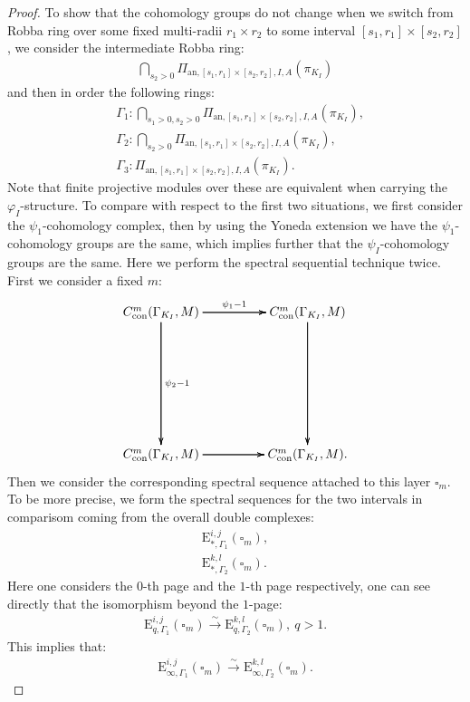 \documentclass[12pt]{amsart}
\theoremstyle{definition}
\numberwithin{equation}{section}
\begin{document}
\begin{proof}
\indent To show that the cohomology groups do not change when we switch from Robba ring over some fixed multi-radii $r_{1}\times r_{2}$ to some interval $[s_1,r_1]\times [s_2,r_2]$, we consider the intermediate Robba ring:
\begin{align}
\bigcap_{s_2>0} \Pi_{\mathrm{an},[s_1,r_1]\times [s_2,r_{2}],I,A}(\pi_{K_I})	
\end{align}
and then in order the following rings:
\begin{align}
&\Gamma_1:\bigcap_{s_1>0,s_2>0} \Pi_{\mathrm{an},[s_1,r_{1}]\times [s_2,r_{2}],I,A}(\pi_{K_I}),\\
&\Gamma_2:\bigcap_{s_2>0} \Pi_{\mathrm{an},[s_1,r_{1}]\times [s_2,r_{2}],I,A}(\pi_{K_I}),\\
&\Gamma_3: \Pi_{\mathrm{an},[s_1,r_{1}]\times [s_2,r_{2}],I,A}(\pi_{K_I}).
\end{align}
Note that finite projective modules over these are equivalent when carrying the  $\varphi_I$-structure. To compare with respect to the first two situations, we first consider the $\psi_1$-cohomology complex, then by using the  Yoneda extension we have the  $\psi_1$-cohomology groups are the same, which implies further that the  $\psi_I$-cohomology groups are the same. Here we perform the spectral sequential technique twice. First we consider a fixed $m$:
\[
\xymatrix@R+6pc@C+2pc{
C^m_{\mathrm{con}}(\Gamma_{K_I},M) \ar[r]^{\psi_1-1} \ar[r] \ar[r] \ar[d]^{\psi_2-1} \ar[d] \ar[d] & C^m_{\mathrm{con}}(\Gamma_{K_I},M) \ar[d] \ar[d] \ar[d]\\
C^m_{\mathrm{con}}(\Gamma_{K_I},M)\ar[r] \ar[r] \ar[r]  &C^m_{\mathrm{con}}(\Gamma_{K_I},M). 
}
\]
Then we consider the corresponding spectral sequence attached to this layer $\square_m$. To be more precise, we form the spectral sequences for the two intervals in comparisom coming from the overall double complexes:
\begin{align}
\mathrm{E}^{i,j}_{*,\Gamma_1}(\square_m),\\
\mathrm{E}^{k,l}_{*,\Gamma_2}(\square_m).
\end{align}
Here one considers the $0$-th page and the $1$-th page respectively, one can see directly that the isomorphism beyond the $1$-page:
\begin{align}
\mathrm{E}^{i,j}_{q,\Gamma_1}(\square_m)\overset{\sim}{\longrightarrow}\mathrm{E}^{k,l}_{q,\Gamma_2}(\square_m),~q>1.
\end{align}
This implies that:
\begin{align}
\mathrm{E}^{i,j}_{\infty,\Gamma_1}(\square_m)\overset{\sim}{\longrightarrow}\mathrm{E}^{k,l}_{\infty,\Gamma_2}(\square_m).

\end{align}
\end{proof}
\end{document}
